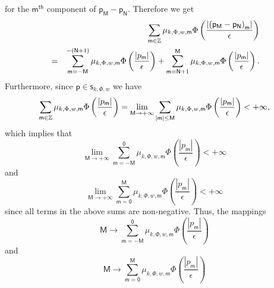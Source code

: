\documentclass{article}
\begin{document}
for the $\mathsf{m}^{\mathsf{th}}$ component of $\mathsf{p}_{\mathsf{M}}-%
\mathsf{p}_{\mathsf{N}}$. Therefore we get%
\begin{eqnarray}
&&\sum_{\mathsf{m}\in \mathbb{Z}}\mu _{k,\Phi ,w,\mathsf{m}}\Phi \left( 
\frac{\left\vert \left( \mathsf{p}_{\mathsf{M}}-\mathsf{p}_{\mathsf{N}%
}\right) _{\mathsf{m}}\right\vert }{\epsilon }\right)  \notag \\
&=&\sum_{\mathsf{m}=-\mathsf{M}}^{-\left( \mathsf{N}+1\right) }\mu _{k,\Phi
,w,\mathsf{m}}\Phi \left( \frac{\left\vert p_{\mathsf{m}}\right\vert }{%
\epsilon }\right) +\sum_{\mathsf{m}=\mathsf{N}+1}^{\mathsf{M}}\mu _{k,\Phi
,w,\mathsf{m}}\Phi \left( \frac{\left\vert p_{\mathsf{m}}\right\vert }{%
\epsilon }\right) .  \label{equalitybis}
\end{eqnarray}%
Furthermore, since $\mathsf{p}\in \mathsf{s}_{k,\Phi ,w}$ we have%
\begin{equation}
\sum_{\mathsf{m}\in \mathbb{Z}}\mu _{k,\Phi ,w,\mathsf{m}}\Phi \left( \frac{%
\left\vert p_{\mathsf{m}}\right\vert }{\epsilon }\right) =\lim_{\mathsf{%
M\rightarrow +\infty }}\sum_{\left\vert \mathsf{m}\right\vert \leq \mathsf{M}%
}\mu _{k,\Phi ,w,\mathsf{m}}\Phi \left( \frac{\left\vert p_{\mathsf{m}%
}\right\vert }{\epsilon }\right) <+\infty ,  \label{convergencequinto}
\end{equation}%
which implies that%
\begin{equation*}
\lim_{\mathsf{M\rightarrow +\infty }}\sum_{\mathsf{m=-M}}^{\mathsf{0}}\mu
_{k,\Phi ,w,\mathsf{m}}\Phi \left( \frac{\left\vert p_{\mathsf{m}%
}\right\vert }{\epsilon }\right) <+\infty
\end{equation*}%
and%
\begin{equation*}
\lim_{\mathsf{M\rightarrow +\infty }}\sum_{\mathsf{m=0}}^{\mathsf{M}}\mu
_{k,\Phi ,w,\mathsf{m}}\Phi \left( \frac{\left\vert p_{\mathsf{m}%
}\right\vert }{\epsilon }\right) <+\infty
\end{equation*}%
since all terms in the above sums are non-negative. Thus, the mappings%
\begin{equation*}
\mathsf{M\rightarrow }\sum_{\mathsf{m=-M}}^{\mathsf{0}}\mu _{k,\Phi ,w,%
\mathsf{m}}\Phi \left( \frac{\left\vert p_{\mathsf{m}}\right\vert }{\epsilon 
}\right)
\end{equation*}%
and 
\begin{equation*}
\mathsf{M\rightarrow }\sum_{\mathsf{m=0}}^{\mathsf{M}}\mu _{k,\Phi ,w,%
\mathsf{m}}\Phi \left( \frac{\left\vert p_{\mathsf{m}}\right\vert }{\epsilon 
}\right)
\end{equation*}%
\end{document}
